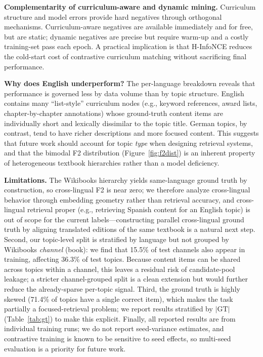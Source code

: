 \documentclass[applsci,article,submit,pdftex,moreauthors]{Definitions/mdpi}
\begin{document}
\textbf{Complementarity of curriculum-aware and dynamic mining.} Curriculum structure and model errors provide hard negatives through orthogonal mechanisms. Curriculum-aware negatives are available immediately and for free, but are static; dynamic negatives are precise but require warm-up and a costly training-set pass each epoch. A practical implication is that H-InfoNCE reduces the cold-start cost of contrastive curriculum matching without sacrificing final performance.

\textbf{Why does English underperform?} The per-language breakdown reveals that performance is governed less by data volume than by topic structure. English contains many ``list-style'' curriculum nodes (e.g., keyword references, award lists, chapter-by-chapter annotations) whose ground-truth content items are individually short and lexically dissimilar to the topic title. German topics, by contrast, tend to have richer descriptions and more focused content. This suggests that future work should account for topic \emph{type} when designing retrieval systems, and that the bimodal F2 distribution (Figure~\ref{fig:f2dist}) is an inherent property of heterogeneous textbook hierarchies rather than a model deficiency.

\textbf{Limitations.} The Wikibooks hierarchy yields same-language ground truth by construction, so cross-lingual F2 is near zero; we therefore analyze cross-lingual behavior through embedding geometry rather than retrieval accuracy, and cross-lingual retrieval proper (e.g., retrieving Spanish content for an English topic) is out of scope for the current labels---constructing parallel cross-lingual ground truth by aligning translated editions of the same textbook is a natural next step. Second, our topic-level split is stratified by language but not grouped by Wikibooks \emph{channel} (book): we find that 15.5\% of test channels also appear in training, affecting 36.3\% of test topics. Because content items can be shared across topics within a channel, this leaves a residual risk of candidate-pool leakage; a stricter channel-grouped split is a clean extension but would further reduce the already-sparse per-topic signal. Third, the ground truth is highly skewed (71.4\% of topics have a single correct item), which makes the task partially a focused-retrieval problem; we report results stratified by $|\text{GT}|$ (Table~\ref{tab:gt}) to make this explicit. Finally, all reported results are from individual training runs; we do not report seed-variance estimates, and contrastive training is known to be sensitive to seed effects, so multi-seed evaluation is a priority for future work.
\end{document}

